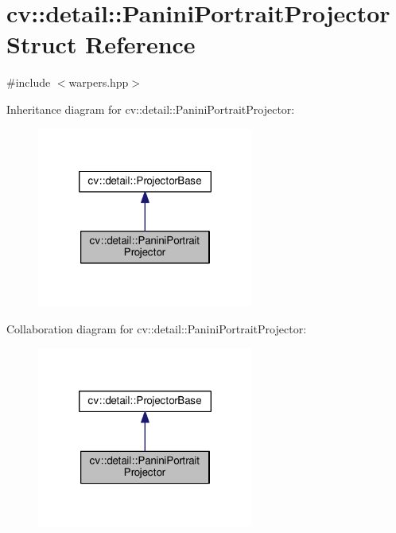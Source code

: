 \hypertarget{structcv_1_1detail_1_1PaniniPortraitProjector}{\section{cv\-:\-:detail\-:\-:Panini\-Portrait\-Projector Struct Reference}
\label{structcv_1_1detail_1_1PaniniPortraitProjector}
}


{\ttfamily \#include $<$warpers.\-hpp$>$}



Inheritance diagram for cv\-:\-:detail\-:\-:Panini\-Portrait\-Projector\-:\nopagebreak
\begin{figure}[H]
\begin{center}
\leavevmode
\includegraphics[width=202pt]{structcv_1_1detail_1_1PaniniPortraitProjector__inherit__graph}
\end{center}
\end{figure}


Collaboration diagram for cv\-:\-:detail\-:\-:Panini\-Portrait\-Projector\-:\nopagebreak
\begin{figure}[H]
\begin{center}
\leavevmode
\includegraphics[width=202pt]{structcv_1_1detail_1_1PaniniPortraitProjector__coll__graph}
\end{center}
\end{figure}
